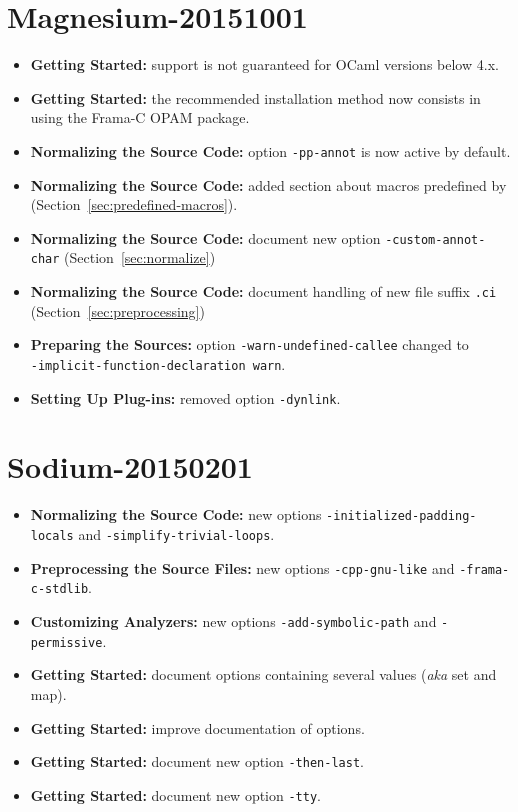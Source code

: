 \section*{Magnesium-20151001}
\begin{itemize}
\item \textbf{Getting Started:} support is not guaranteed for OCaml versions
below 4.x.
\item \textbf{Getting Started:} the recommended installation method now consists
in using the Frama-C OPAM package.
\item \textbf{Normalizing the Source Code:} option \texttt{-pp-annot} is now
active by default.
\item \textbf{Normalizing the Source Code:} added section about macros
predefined by \FramaC (Section~\ref{sec:predefined-macros}).
\item \textbf{Normalizing the Source Code:} document new option
  \texttt{-custom-annot-char} (Section~\ref{sec:normalize})
\item \textbf{Normalizing the Source Code:} document handling of
  new file suffix \texttt{.ci} (Section~\ref{sec:preprocessing})
\item \textbf{Preparing the Sources:} option \texttt{-warn-undefined-callee}
  changed to \\ \texttt{-implicit-function-declaration warn}.
\item \textbf{Setting Up Plug-ins:} removed option \texttt{-dynlink}.
\end{itemize}

\section*{Sodium-20150201}
\begin{itemize}
\item \textbf{Normalizing the Source Code:} new options
  \texttt{-initialized-padding-locals} and \texttt{-simplify-trivial-loops}.
\item \textbf{Preprocessing the Source Files:} new options
  \texttt{-cpp-gnu-like} and \texttt{-frama-c-stdlib}.
\item \textbf{Customizing Analyzers:} new options
  \texttt{-add-symbolic-path} and \texttt{-permissive}.
\item \textbf{Getting Started:} document options containing several values
  (\emph{aka} set and map).
\item \textbf{Getting Started:} improve documentation of options.
\item \textbf{Getting Started:} document new option \texttt{-then-last}.
\item \textbf{Getting Started:} document new option \texttt{-tty}.
\end{itemize}

